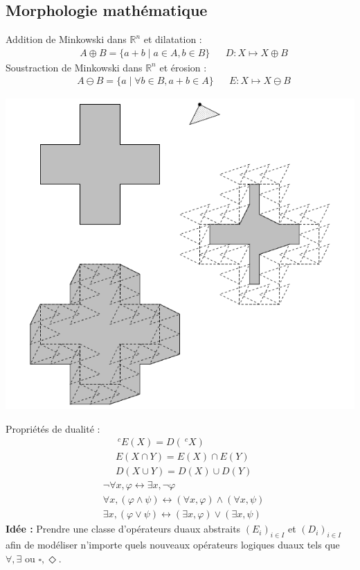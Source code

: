 \documentclass{beamer}
\begin{document}
\subsection{Morphologie mathématique}

\begin{frame}
Addition de Minkowski dans $\mathbb{R}^n$ et dilatation :
\begin{align*} & A \oplus B = \{ a + b \mid a \in A, b \in B \} &
 & D : X \mapsto X \oplus B
\end{align*}
\pause
Soustraction de Minkowski dans $\mathbb{R}^n$ et érosion : 
\begin{align*} & A \ominus B = \{ a \mid \forall b \in B , a + b \in A \}   & & E : X \mapsto X \ominus B
\end{align*}
\pause
\begin{center}
\includegraphics[scale=0.3]{erodil.png}
\end{center}
\end{frame}

\begin{frame}
Propriétés de dualité :
\begin{align*}
& ~^{c} E(X) = D(~^{c} X) \\
& E(X \cap Y) = E(X) \cap E(Y) \\
& D(X \cup Y) = D(X) \cup D(Y)
\end{align*} \pause
\begin{align*}
& \neg \forall x, \varphi \leftrightarrow \exists x, \neg \varphi \\
& \forall x, (\varphi \wedge \psi) \leftrightarrow (\forall x, \varphi) \wedge (\forall x, \psi) \\
& \exists x, (\varphi \vee \psi) \leftrightarrow (\exists x, \varphi) \vee (\exists x, \psi)
\end{align*} 
\textbf{Idée :} Prendre une classe d'opérateurs duaux abstraits $(E_i)_{i\in I}$ et $(D_i)_{i\in I}$ afin de modéliser n'importe quels nouveaux opérateurs logiques duaux tels que $\forall, \exists$ ou $\square, \Diamond$.
\end{frame}
\end{document}
